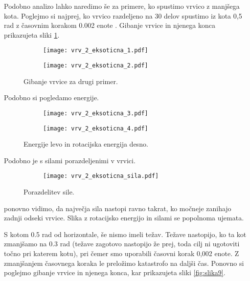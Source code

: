 \documentclass[12pt,a4paper]{article}
\begin{document}
Podobno analizo lahko naredimo še za primere, ko spustimo vrvico z manjšega kota. Poglejmo si najprej, ko vrvico razdeljeno na 30 delov spustimo iz kota 0,5 rad z časovnim korakom 0.002 enote . Gibanje vrvice in njenega konca prikazujeta sliki \ref{fig:slika6}. 

\begin{figure}[H]
    \centering
    \begin{subfigure}[b]{0.45\textwidth}  			
        \texttt{[image: vrv\_2\_eksoticna\_1.pdf]}
    \end{subfigure}
    \begin{subfigure}[b]{0.45\textwidth}  			
        \texttt{[image: vrv\_2\_eksoticna\_2.pdf]}
    \end{subfigure}
    \caption{Gibanje vrvice za drugi primer.} \label{fig:slika6}
\end{figure}
\noindent Podobno si pogledamo energije.
\begin{figure}[H]
    \centering
    \begin{subfigure}[b]{0.45\textwidth}  			
        \texttt{[image: vrv\_2\_eksoticna\_3.pdf]}
    \end{subfigure}
    \begin{subfigure}[b]{0.45\textwidth}  			
        \texttt{[image: vrv\_2\_eksoticna\_4.pdf]}
    \end{subfigure}
    \caption{Energije levo in rotacijska energija desno.} \label{fig:slika7}
\end{figure}
\noindent Podobno je s silami porazdeljenimi v vrvici.
\begin{figure}[H]
    \centering
    \begin{subfigure}[b]{0.6\textwidth}  			
        \texttt{[image: vrv\_2\_eksoticna\_sila.pdf]}
    \end{subfigure}
    \caption{Porazdelitev sile.} \label{fig:slika8}
\end{figure}
\noindent ponovno vidimo, da največja sila nastopi ravno takrat, ko močneje zanihajo zadnji odseki vrvice. Slika z rotacijsko energijo in silami se popolnoma ujemata.

S kotom 0.5 rad od horizontale, še nismo imeli težav. Težave nastopijo, ko ta kot zmanjšamo na 0.3 rad (težave zagotovo nastopijo že prej, toda cilj ni ugotoviti točno pri katerem kotu), pri čemer smo uporabili časovni korak 0,002 enote. Z zmanjšanjem časovnega koraka le preložimo katastrofo na daljši čas. Ponovno si poglejmo gibanje vrvice in njenega konca, kar prikazujeta sliki \ref{fig:slika9}.
\end{document}

